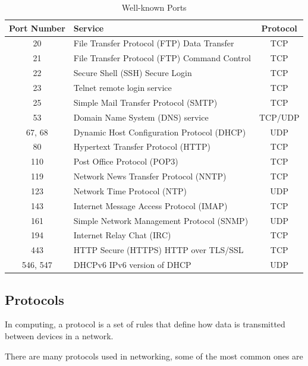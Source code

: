 \begin{table}[h!]
\caption{Well-known Ports}
\begin{tabular}{c l c}
\toprule
Port Number & Service & Protocol \\
\midrule
20 & File Transfer Protocol (FTP) Data Transfer & TCP \\
21 & File Transfer Protocol (FTP) Command Control & TCP \\
22 & Secure Shell (SSH) Secure Login & TCP \\
23 & Telnet remote login service& TCP \\
25 & Simple Mail Transfer Protocol (SMTP)& TCP \\
53 & Domain Name System (DNS) service & TCP/UDP \\
67, 68 & Dynamic Host Configuration Protocol (DHCP) & UDP \\
80 & Hypertext Transfer Protocol (HTTP) & TCP \\
110 & Post Office Protocol (POP3) & TCP \\
119 & Network News Transfer Protocol (NNTP) & TCP \\
123 & Network Time Protocol (NTP) & UDP \\
143 & Internet Message Access Protocol (IMAP) & TCP \\
161 & Simple Network Management Protocol (SNMP) & UDP \\
194 & Internet Relay Chat (IRC) & TCP \\
443 & HTTP Secure (HTTPS) HTTP over TLS/SSL & TCP \\
546, 547 & DHCPv6 IPv6 version of DHCP & UDP \\
\bottomrule
\end{tabular}
\end{table}

\subsection{Protocols}

\begin{definition}[Protocols]
In computing, a protocol is a set of rules that define
how data is transmitted between devices in a network.
\end{definition}

There are many protocols used in networking, some of
the most common ones are

